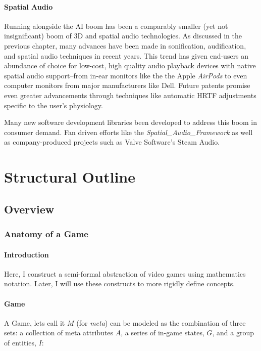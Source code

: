\documentclass{report}
\begin{document}
\paragraph{Spatial Audio}
Running alongside the AI boom has been a comparably smaller (yet not insignificant) boom of 3D and spatial audio technologies. As discussed in the previous chapter, many advances have been made in sonification, audification, and spatial audio techniques in recent years. This trend has given end-users an abundance of choice for low-cost, high quality audio playback devices with native spatial audio support--from in-ear monitors like the the Apple \emph{AirPods}\cite{ApplePods} to even computer monitors from major manufacturers like Dell\cite{Campbell_2025}. Future patents promise even greater advancements through techniques like automatic HRTF adjustments specific to the user's physiology\cite{Antti2024}.


Many new software development libraries been developed to address this boom in consumer demand. Fan driven efforts like the \emph{Spatial\_Audio\_Framework}\cite{McCormack2024} as well as company-produced projects such as Valve Software's Steam Audio\cite{Valve}.





\section{Structural Outline}
\subsection{Overview}
\subsubsection{Anatomy of a Game}
\paragraph{Introduction}
Here, I construct a semi-formal abstraction of video games using mathematics notation. Later, I will use these constructs to more rigidly define concepts.


\paragraph{Game}
A Game, lets call it $M$ (for \emph{meta}) can be modeled as the combination of three sets: a collection of meta attributes $A$, a series of in-game states, $G$, and a group of entities, $I$:
\end{document}
